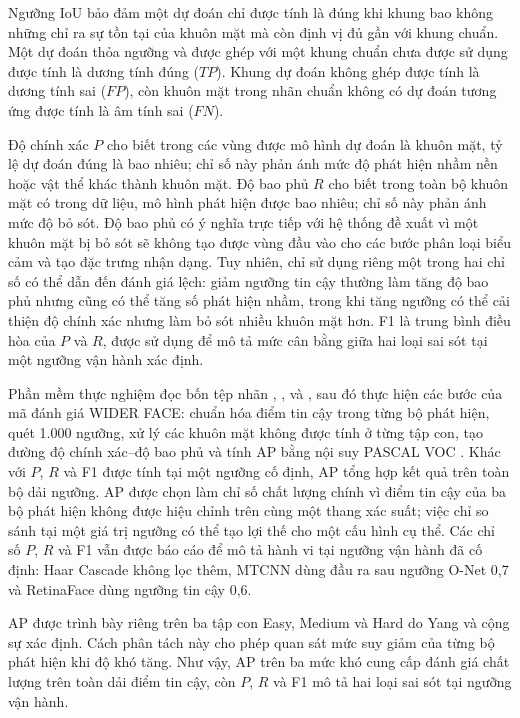 \documentclass[../LuanVan.tex]{subfiles}
\begin{document}
Ngưỡng IoU bảo đảm một dự đoán chỉ được tính là đúng khi khung bao không những chỉ ra sự tồn tại của khuôn mặt mà còn định vị đủ gần với khung chuẩn. Một dự đoán thỏa ngưỡng và được ghép với một khung chuẩn chưa được sử dụng được tính là dương tính đúng ($TP$). Khung dự đoán không ghép được tính là dương tính sai ($FP$), còn khuôn mặt trong nhãn chuẩn không có dự đoán tương ứng được tính là âm tính sai ($FN$).

Độ chính xác $P$ cho biết trong các vùng được mô hình dự đoán là khuôn mặt, tỷ lệ dự đoán đúng là bao nhiêu; chỉ số này phản ánh mức độ phát hiện nhầm nền hoặc vật thể khác thành khuôn mặt. Độ bao phủ $R$ cho biết trong toàn bộ khuôn mặt có trong dữ liệu, mô hình phát hiện được bao nhiêu; chỉ số này phản ánh mức độ bỏ sót. Độ bao phủ có ý nghĩa trực tiếp với hệ thống đề xuất vì một khuôn mặt bị bỏ sót sẽ không tạo được vùng đầu vào cho các bước phân loại biểu cảm và tạo đặc trưng nhận dạng. Tuy nhiên, chỉ sử dụng riêng một trong hai chỉ số có thể dẫn đến đánh giá lệch: giảm ngưỡng tin cậy thường làm tăng độ bao phủ nhưng cũng có thể tăng số phát hiện nhầm, trong khi tăng ngưỡng có thể cải thiện độ chính xác nhưng làm bỏ sót nhiều khuôn mặt hơn. F1 là trung bình điều hòa của $P$ và $R$, được sử dụng để mô tả mức cân bằng giữa hai loại sai sót tại một ngưỡng vận hành xác định.

Phần mềm thực nghiệm đọc bốn tệp nhãn , ,  và , sau đó thực hiện các bước của mã đánh giá WIDER FACE: chuẩn hóa điểm tin cậy trong từng bộ phát hiện, quét 1.000 ngưỡng, xử lý các khuôn mặt không được tính ở từng tập con, tạo đường độ chính xác--độ bao phủ và tính AP bằng nội suy PASCAL VOC \cite{everingham2010pascal,widerFaceEvaluation}. Khác với $P$, $R$ và F1 được tính tại một ngưỡng cố định, AP tổng hợp kết quả trên toàn bộ dải ngưỡng. AP được chọn làm chỉ số chất lượng chính vì điểm tin cậy của ba bộ phát hiện không được hiệu chỉnh trên cùng một thang xác suất; việc chỉ so sánh tại một giá trị ngưỡng có thể tạo lợi thế cho một cấu hình cụ thể. Các chỉ số $P$, $R$ và F1 vẫn được báo cáo để mô tả hành vi tại ngưỡng vận hành đã cố định: Haar Cascade không lọc thêm, MTCNN dùng đầu ra sau ngưỡng O-Net 0,7 và RetinaFace dùng ngưỡng tin cậy 0,6.

AP được trình bày riêng trên ba tập con Easy, Medium và Hard do Yang và cộng sự xác định. Cách phân tách này cho phép quan sát mức suy giảm của từng bộ phát hiện khi độ khó tăng. Như vậy, AP trên ba mức khó cung cấp đánh giá chất lượng trên toàn dải điểm tin cậy, còn $P$, $R$ và F1 mô tả hai loại sai sót tại ngưỡng vận hành.
\end{document}

